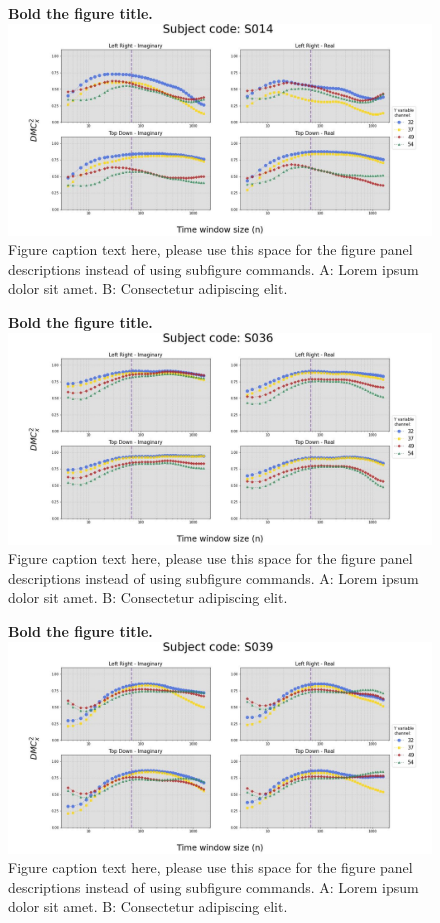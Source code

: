 \documentclass[10pt,letterpaper]{article}
\begin{document}
\begin{figure}[!h]
\caption{{\bf Bold the figure title.}
\includegraphics[width=.9\textwidth]{../output/figs/stats/S014.jpg}
Figure caption text here, please use this space for the figure panel descriptions instead of using subfigure commands. A: Lorem ipsum dolor sit amet. B: Consectetur adipiscing elit.}
\label{fig1}
\end{figure}

\begin{figure}[!h]
  \caption{{\bf Bold the figure title.}
  \includegraphics[width=.9\textwidth]{../output/figs/stats/S036.jpg}
  Figure caption text here, please use this space for the figure panel descriptions instead of using subfigure commands. A: Lorem ipsum dolor sit amet. B: Consectetur adipiscing elit.}
  \label{fig36}
\end{figure}

\begin{figure}[!h]
    \caption{{\bf Bold the figure title.}
    \includegraphics[width=.9\textwidth]{../output/figs/stats/S039.jpg}
    Figure caption text here, please use this space for the figure panel descriptions instead of using subfigure commands. A: Lorem ipsum dolor sit amet. B: Consectetur adipiscing elit.}
    \label{fig39}
\end{figure}
\end{document}
